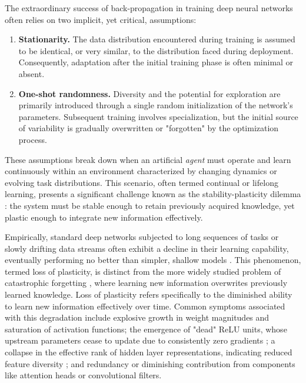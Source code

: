 \documentclass{article}
\begin{document}
The extraordinary success of back-propagation in training deep neural networks often relies on two implicit, yet critical, assumptions:
\begin{enumerate}
    \item \textbf{Stationarity.} The data distribution encountered during training is assumed to be identical, or very similar, to the distribution faced during deployment. Consequently, adaptation after the initial training phase is often minimal or absent.
    \item \textbf{One-shot randomness.} Diversity and the potential for exploration are primarily introduced through a single random initialization of the network's parameters. Subsequent training involves specialization, but the initial source of variability is gradually overwritten or "forgotten" by the optimization process.
\end{enumerate}
These assumptions break down when an artificial \emph{agent} must operate and learn continuously within an environment characterized by changing dynamics or evolving task distributions. This scenario, often termed continual or lifelong learning, presents a significant challenge known as the stability-plasticity dilemma \cite{abraham2005memory}: the system must be stable enough to retain previously acquired knowledge, yet plastic enough to integrate new information effectively.

Empirically, standard deep networks subjected to long sequences of tasks or slowly drifting data streams often exhibit a decline in their learning capability, eventually performing no better than simpler, shallow models \cite{dohare2024loss}. This phenomenon, termed loss of plasticity, is distinct from the more widely studied problem of catastrophic forgetting \cite{mccloskey1989catastrophic, ratcliff1990connectionist, french1999catastrophic}, where learning new information overwrites previously learned knowledge. Loss of plasticity refers specifically to the diminished ability to learn new information effectively over time. Common symptoms associated with this degradation include explosive growth in weight magnitudes and saturation of activation functions; the emergence of "dead" ReLU units, whose upstream parameters cease to update due to consistently zero gradients \cite{nair2010rectified}; a collapse in the effective rank of hidden layer representations, indicating reduced feature diversity \cite{papyan2020prevalence, huh2022lowrank}; and redundancy or diminishing contribution from components like attention heads or convolutional filters.
\end{document}
